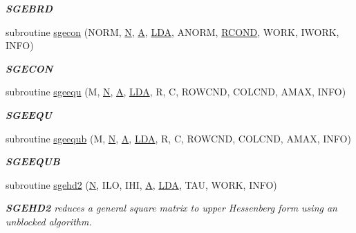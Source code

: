 \begin{DoxyCompactItemize}
\begin{DoxyCompactList}\small\item\em {\bfseries S\+G\+E\+B\+R\+D} \end{DoxyCompactList}\item 
subroutine \hyperlink{group__realGEcomputational_ga89f21d7700aaccc5fc72ca3316c33463}{sgecon} (N\+O\+R\+M, \hyperlink{polmisc_8c_a0240ac851181b84ac374872dc5434ee4}{N}, \hyperlink{classA}{A}, \hyperlink{example__user_8c_ae946da542ce0db94dced19b2ecefd1aa}{L\+D\+A}, A\+N\+O\+R\+M, \hyperlink{superlu__enum__consts_8h_af00a42ecad444bbda75cde1b64bd7e72a9b5c151728d8512307565994c89919d5}{R\+C\+O\+N\+D}, W\+O\+R\+K, I\+W\+O\+R\+K, I\+N\+F\+O)
\begin{DoxyCompactList}\small\item\em {\bfseries S\+G\+E\+C\+O\+N} \end{DoxyCompactList}\item 
subroutine \hyperlink{group__realGEcomputational_ga21857aa111bbc0e5231be33c077aa621}{sgeequ} (M, \hyperlink{polmisc_8c_a0240ac851181b84ac374872dc5434ee4}{N}, \hyperlink{classA}{A}, \hyperlink{example__user_8c_ae946da542ce0db94dced19b2ecefd1aa}{L\+D\+A}, R, C, R\+O\+W\+C\+N\+D, C\+O\+L\+C\+N\+D, A\+M\+A\+X, I\+N\+F\+O)
\begin{DoxyCompactList}\small\item\em {\bfseries S\+G\+E\+E\+Q\+U} \end{DoxyCompactList}\item 
subroutine \hyperlink{group__realGEcomputational_gaf05e763f3d07240f35350dd583ecf4f2}{sgeequb} (M, \hyperlink{polmisc_8c_a0240ac851181b84ac374872dc5434ee4}{N}, \hyperlink{classA}{A}, \hyperlink{example__user_8c_ae946da542ce0db94dced19b2ecefd1aa}{L\+D\+A}, R, C, R\+O\+W\+C\+N\+D, C\+O\+L\+C\+N\+D, A\+M\+A\+X, I\+N\+F\+O)
\begin{DoxyCompactList}\small\item\em {\bfseries S\+G\+E\+E\+Q\+U\+B} \end{DoxyCompactList}\item 
subroutine \hyperlink{group__realGEcomputational_ga08e8e4fef5295cd00f6762994a817e60}{sgehd2} (\hyperlink{polmisc_8c_a0240ac851181b84ac374872dc5434ee4}{N}, I\+L\+O, I\+H\+I, \hyperlink{classA}{A}, \hyperlink{example__user_8c_ae946da542ce0db94dced19b2ecefd1aa}{L\+D\+A}, T\+A\+U, W\+O\+R\+K, I\+N\+F\+O)
\begin{DoxyCompactList}\small\item\em {\bfseries S\+G\+E\+H\+D2} reduces a general square matrix to upper Hessenberg form using an unblocked algorithm. \end{DoxyCompactList}\item 

\end{DoxyCompactItemize}
